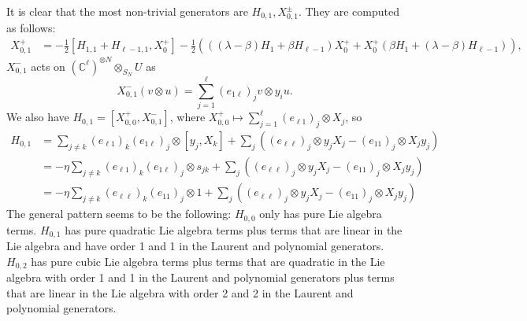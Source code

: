 \documentclass[11pt]{report}
\theoremstyle{definition}
\theoremstyle{remark}
\theoremstyle{remark}
\newcommand{\C}{\mathbb{C}}
\begin{document}
It is clear that the most non-trivial generators are $H_{0,1},X_{0,1}^\pm$. They are computed as follows:
\begin{align*}
X_{0,1}^+ &= -\frac{1}{2} [H_{1,1}+H_{\ell-1,1},X_0^+]-\frac{1}{2}(((\lambda-\beta)H_1+\beta H_{\ell-1})X_0^+ + X_0^+(\beta H_1+(\lambda-\beta)H_{\ell-1})),
\end{align*}
$X_{0,1}^-$ acts on $(\C^\ell)^{\otimes N} \otimes_{S_N} U$ as
\begin{equation*}
X_{0,1}^-(v \otimes u) = \sum_{j=1}^\ell (e_{1\ell})_j v \otimes y_i u.
\end{equation*}
We also have $H_{0,1} = [X_{0,0}^+,X_{0,1}^-]$, where $X_{0,0}^+ \mapsto \sum_{j=1}^\ell (e_{\ell 1})_j \otimes X_j$, so
\begin{align*}
H_{0,1}
&= \sum_{j \neq k} (e_{\ell 1})_k (e_{1 \ell})_j \otimes [y_j,X_k] + \sum_j ((e_{\ell\ell})_j \otimes y_j X_j - (e_{11})_j \otimes X_j y_j) \\
&= -\eta \sum_{j \neq k} (e_{\ell 1})_k (e_{1 \ell})_j \otimes s_{jk} + \sum_j ((e_{\ell\ell})_j \otimes y_j X_j - (e_{11})_j \otimes X_j y_j) \\
&= -\eta \sum_{j \neq k} (e_{\ell\ell})_k (e_{11})_j \otimes 1 + \sum_j ((e_{\ell\ell})_j \otimes y_j X_j - (e_{11})_j \otimes X_j y_j)
\end{align*}
The general pattern seems to be the following: $H_{0,0}$ only has pure Lie algebra terms. $H_{0,1}$ has pure quadratic Lie algebra terms plus terms that are linear in the Lie algebra and have order 1 and 1 in the Laurent and polynomial generators. $H_{0,2}$ has pure cubic Lie algebra terms plus terms that are quadratic in the Lie algebra with order 1 and 1 in the Laurent and polynomial generators plus terms that are linear in the Lie algebra with order 2 and 2 in the Laurent and polynomial generators.
\end{document}
